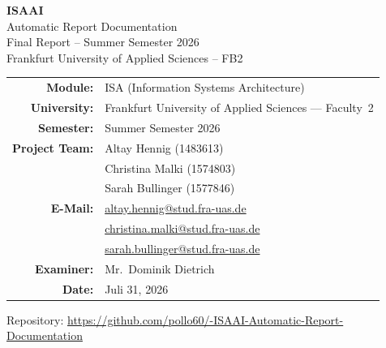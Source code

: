 \documentclass[11pt,a4paper]{article}
\begin{document}

\thispagestyle{empty}

\begin{center}
  \vspace*{3cm}

  {\color{ISAAIBlue}\Huge\bfseries ISAAI}\\[0.3em]
  {\color{ISAAIBlue}\LARGE Automatic Report Documentation}\\[1.5em]

  {\large Final Report -- Summer Semester 2026}\\[0.5em]
  {\small\color{ISAAIMuted} Frankfurt University of Applied Sciences -- FB2}\\[3em]

 
  \begin{tabular}{@{}rl@{}}
    \textbf{Module:}      & ISA (Information Systems Architecture) \\[0.3em]
    \textbf{University:}  & Frankfurt University of Applied Sciences --- Faculty~2 \\[0.3em]
    \textbf{Semester:}    & Summer Semester 2026 \\[0.3em]
    \textbf{Project Team:} & Altay Hennig (1483613) \\
                           & Christina Malki (1574803) \\
                           & Sarah Bullinger (1577846) \\[0.3em]
    \textbf{E-Mail:}      & \href{mailto:altay.hennig@stud.fra-uas.de}{altay.hennig@stud.fra-uas.de} \\
                           & \href{mailto:christina.malki@stud.fra-uas.de}{christina.malki@stud.fra-uas.de} \\
                           & \href{mailto:sarah.bullinger@stud.fra-uas.de}{sarah.bullinger@stud.fra-uas.de} \\[0.3em]
    \textbf{Examiner:}   & Mr.\ Dominik Dietrich \\[0.3em]
    \textbf{Date:}        & Juli 31, 2026 \\
  \end{tabular}

  \vfill
  {\small\color{ISAAIMuted}
    Repository:
    \url{https://github.com/pollo60/-ISAAI-Automatic-Report-Documentation}}

\end{center}
\end{document}
